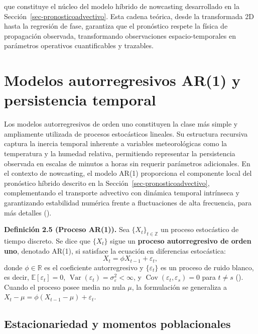 \documentclass[
  spanish,
  us-letterpaper,
]{scrreprt}
\numberwithin{equation}{section}
\begin{document}
que constituye el núcleo del modelo híbrido de nowcasting desarrollado
en la Sección~\ref{sec-pronosticoadvectivo}. Esta cadena teórica, desde
la transformada 2D hasta la regresión de fase, garantiza que el
pronóstico respete la física de propagación observada, transformando
observaciones espacio-temporales en parámetros operativos cuantificables
y trazables.

\section{Modelos autorregresivos AR(1) y persistencia
temporal}\label{sec-ar1}

Los modelos autorregresivos de orden uno constituyen la clase más simple
y ampliamente utilizada de procesos estocásticos lineales. Su estructura
recursiva captura la inercia temporal inherente a variables
meteorológicas como la temperatura y la humedad relativa, permitiendo
representar la persistencia observada en escalas de minutos a horas sin
requerir parámetros adicionales. En el contexto de nowcasting, el modelo
AR(1) proporciona el componente local del pronóstico híbrido descrito en
la Sección~\ref{sec-pronosticoadvectivo}, complementando el transporte
advectivo con dinámica temporal intrínseca y garantizando estabilidad
numérica frente a fluctuaciones de alta frecuencia, para más detalles
().

\textbf{Definición 2.5 (Proceso AR(1)).} Sea
\(\{X_t\}_{t \in \mathbb{Z}}\) un proceso estocástico de tiempo
discreto. Se dice que \(\{X_t\}\) sigue un \textbf{proceso
autorregresivo de orden uno}, denotado AR(1), si satisface la ecuación
en diferencias estocástica: \[
X_t = \phi X_{t-1} + \varepsilon_t,
\] donde \(\phi \in \mathbb{R}\) es el coeficiente autorregresivo y
\(\{\varepsilon_t\}\) es un proceso de ruido blanco, es decir,
\(\mathbb{E}[\varepsilon_t] = 0\),
\(\operatorname{Var}(\varepsilon_t) = \sigma_\varepsilon^2 < \infty\), y
\(\operatorname{Cov}(\varepsilon_t, \varepsilon_s) = 0\) para
\(t \neq s\) (). Cuando el
proceso posee media no nula \(\mu\), la formulación se generaliza a
\(X_t - \mu = \phi(X_{t-1} - \mu) + \varepsilon_t\).

\subsection{Estacionariedad y momentos
poblacionales}\label{estacionariedad-y-momentos-poblacionales}
\end{document}
